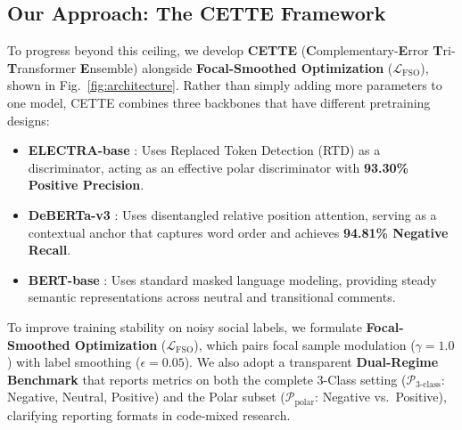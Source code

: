 \documentclass[10pt,conference]{IEEEtran}
\begin{document}
\subsection{Our Approach: The CETTE Framework}
To progress beyond this ceiling, we develop \textbf{CETTE} (\textbf{C}omplementary-\textbf{E}rror \textbf{T}ri-\textbf{T}ransformer \textbf{E}nsemble) alongside \textbf{Focal-Smoothed Optimization} ($\mathcal{L}_{\text{FSO}}$), shown in Fig.~\ref{fig:architecture}. Rather than simply adding more parameters to one model, CETTE combines three backbones that have different pretraining designs:
\begin{itemize}
    \item \textbf{ELECTRA-base} \cite{clark2020}: Uses Replaced Token Detection (RTD) as a discriminator, acting as an effective polar discriminator with \textbf{93.30\% Positive Precision}.
    \item \textbf{DeBERTa-v3} \cite{he2021}: Uses disentangled relative position attention, serving as a contextual anchor that captures word order and achieves \textbf{94.81\% Negative Recall}.
    \item \textbf{BERT-base} \cite{devlin2019}: Uses standard masked language modeling, providing steady semantic representations across neutral and transitional comments.
\end{itemize}

To improve training stability on noisy social labels, we formulate \textbf{Focal-Smoothed Optimization} ($\mathcal{L}_{\text{FSO}}$), which pairs focal sample modulation ($\gamma=1.0$) with label smoothing ($\epsilon=0.05$). We also adopt a transparent \textbf{Dual-Regime Benchmark} that reports metrics on both the complete 3-Class setting ($\mathcal{P}_{\text{3-class}}$: Negative, Neutral, Positive) and the Polar subset ($\mathcal{P}_{\text{polar}}$: Negative vs.\ Positive), clarifying reporting formats in code-mixed research.
\end{document}
